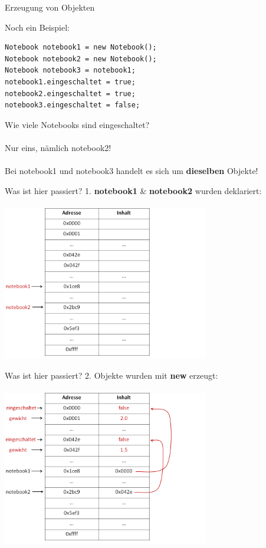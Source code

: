 \documentclass[18pt]{beamer}
\begin{document}
\begin{frame}[fragile]{Erzeugung von Objekten}
\begin{exampleblock}{Noch ein Beispiel:}
\begin{lstlisting}
Notebook notebook1 = new Notebook();
Notebook notebook2 = new Notebook();
Notebook notebook3 = notebook1;
notebook1.eingeschaltet = true;
notebook2.eingeschaltet = true;
notebook3.eingeschaltet = false;
\end{lstlisting}
\end{exampleblock}
\begin{center}
Wie viele Notebooks sind eingeschaltet?\\
\ \\
\pause
{\Large Nur eins, nämlich notebook2!}\\
\ \\
Bei notebook1 und notebook3 handelt es sich um \textbf{dieselben} Objekte!
\end{center}
\end{frame}

\begin{frame}{Was ist hier passiert?}
1. \textbf{notebook1} \& \textbf{notebook2} wurden deklariert:\\ 
  \ \\ 
\includegraphics[width=9cm]{logos/deklaration}
\end{frame}

\begin{frame}{Was ist hier passiert?}
2. Objekte wurden mit \textbf{new} erzeugt:\\ 
  \ \\ 
\includegraphics[width=9cm]{logos/erzeugung}
\end{frame}
\end{document}
